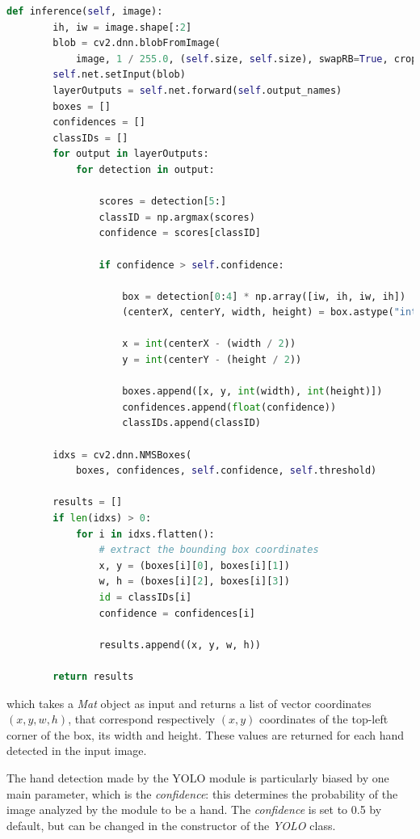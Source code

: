 \begin{lstlisting}[language = python]
    def inference(self, image):
        ih, iw = image.shape[:2]
        blob = cv2.dnn.blobFromImage(
            image, 1 / 255.0, (self.size, self.size), swapRB=True, crop=False)
        self.net.setInput(blob)
        layerOutputs = self.net.forward(self.output_names)
        boxes = []
        confidences = []
        classIDs = []
        for output in layerOutputs:
            for detection in output:

                scores = detection[5:]
                classID = np.argmax(scores)
                confidence = scores[classID]

                if confidence > self.confidence:

                    box = detection[0:4] * np.array([iw, ih, iw, ih])
                    (centerX, centerY, width, height) = box.astype("int")

                    x = int(centerX - (width / 2))
                    y = int(centerY - (height / 2))

                    boxes.append([x, y, int(width), int(height)])
                    confidences.append(float(confidence))
                    classIDs.append(classID)

        idxs = cv2.dnn.NMSBoxes(
            boxes, confidences, self.confidence, self.threshold)

        results = []
        if len(idxs) > 0:
            for i in idxs.flatten():
                # extract the bounding box coordinates
                x, y = (boxes[i][0], boxes[i][1])
                w, h = (boxes[i][2], boxes[i][3])
                id = classIDs[i]
                confidence = confidences[i]

                results.append((x, y, w, h))

        return results
\end{lstlisting}

which takes a \textit{Mat} object as input and returns a list of vector coordinates $(x,y,w,h)$, that correspond respectively $(x,y)$ 
coordinates of the top-left corner of the box, its width and height. These values are returned for each hand detected in the input image.

The hand detection made by the YOLO module is particularly biased by one main parameter, which is the \textit{confidence}: this determines the 
probability of the image analyzed by the module to be a hand. The \textit{confidence} is set to 0.5 by default, but can be changed in the constructor of the \textit{YOLO} class.

